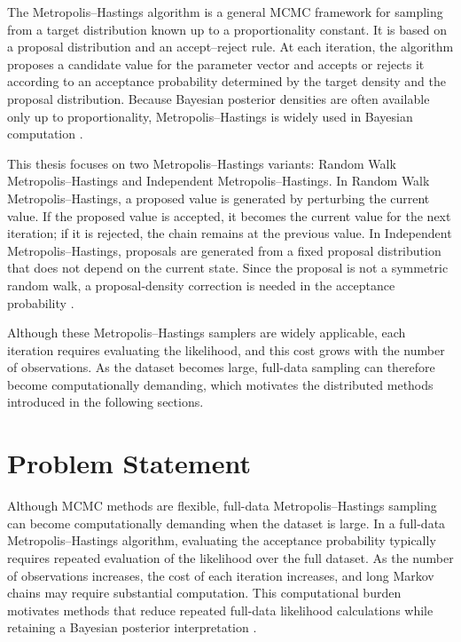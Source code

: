 The Metropolis--Hastings algorithm is a general MCMC framework for sampling from a target distribution known up to a proportionality constant. It is based on a proposal distribution and an accept--reject rule. At each iteration, the algorithm proposes a candidate value for the parameter vector and accepts or rejects it according to an acceptance probability determined by the target density and the proposal distribution. Because Bayesian posterior densities are often available only up to proportionality, Metropolis--Hastings is widely used in Bayesian computation \cite{metropolis1953equation,hastings1970monte,chib1995understanding}.

This thesis focuses on two Metropolis--Hastings variants: Random Walk Metropolis--Hastings and Independent Metropolis--Hastings. In Random Walk Metropolis--Hastings, a proposed value is generated by perturbing the current value. If the proposed value is accepted, it becomes the current value for the next iteration; if it is rejected, the chain remains at the previous value. In Independent Metropolis--Hastings, proposals are generated from a fixed proposal distribution that does not depend on the current state. Since the proposal is not a symmetric random walk, a proposal-density correction is needed in the acceptance probability \cite{hastings1970monte,chib1995understanding,roberts1997weak}.

Although these Metropolis--Hastings samplers are widely applicable, each iteration requires evaluating the likelihood, and this cost grows with the number of observations. As the dataset becomes large, full-data sampling can therefore become computationally demanding, which motivates the distributed methods introduced in the following sections.

\section{Problem Statement}

Although MCMC methods are flexible, full-data Metropolis--Hastings sampling can become computationally demanding when the dataset is large. In a full-data Metropolis--Hastings algorithm, evaluating the acceptance probability typically requires repeated evaluation of the likelihood over the full dataset. As the number of observations increases, the cost of each iteration increases, and long Markov chains may require substantial computation. This computational burden motivates methods that reduce repeated full-data likelihood calculations while retaining a Bayesian posterior interpretation \cite{huang2005sampling}.

